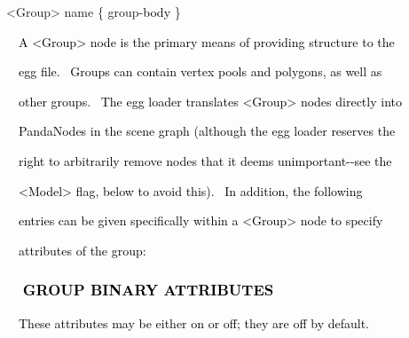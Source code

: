 \documentclass[a4paper]{article}
\newcommand\textstyleOOoComputerKeyWord[1]{\textrm{\textcolor[rgb]{0.0,0.0,0.5019608}{#1}}}
\newcommand\textstyleOOoAssemblerSpecialChar[1]{\textrm{\textcolor[rgb]{0.0,0.5019608,0.0}{#1}}}
\newcommand\textstyleOOoAssemblerIdent[1]{\textrm{\textcolor{black}{#1}}}
\newcommand\textstyleOOoAssemblerDirective[1]{\textrm{\textcolor[rgb]{0.0,0.5019608,1.0}{#1}}}
\begin{document}
{\color{black}
\textstyleOOoAssemblerSpecialChar{{\textless}}\textstyleOOoAssemblerDirective{Group}\textstyleOOoAssemblerSpecialChar{{\textgreater}}\textstyleOOoComputerKeyWord{\textcolor{black}{
}}\textstyleOOoAssemblerDirective{name}\textstyleOOoComputerKeyWord{\textcolor{black}{
}}\textstyleOOoAssemblerSpecialChar{\{}\textstyleOOoComputerKeyWord{\textcolor{black}{
}}\textstyleOOoAssemblerDirective{group}\textstyleOOoAssemblerSpecialChar{{}-}\textstyleOOoAssemblerIdent{body}\textstyleOOoComputerKeyWord{\textcolor{black}{
}}\textstyleOOoAssemblerSpecialChar{\}}}


\bigskip

{\color{black}
\textstyleOOoComputerKeyWord{\textcolor{black}{\ \ A {\textless}Group{\textgreater} node is the primary means of
providing structure to the}}}

{\color{black}
\textstyleOOoComputerKeyWord{\textcolor{black}{\ \ egg file. \ Groups can contain vertex pools and polygons, as well
as}}}

{\color{black}
\textstyleOOoComputerKeyWord{\textcolor{black}{\ \ other groups. \ The egg loader translates
{\textless}Group{\textgreater} nodes directly into}}}

{\color{black}
\textstyleOOoComputerKeyWord{\textcolor{black}{\ \ PandaNodes in the scene graph (although the egg loader reserves
the}}}

{\color{black}
\textstyleOOoComputerKeyWord{\textcolor{black}{\ \ right to arbitrarily remove nodes that it deems unimportant-{}-see
the}}}

{\color{black}
\textstyleOOoComputerKeyWord{\textcolor{black}{\ \ {\textless}Model{\textgreater} flag, below to avoid this). \ In
addition, the following}}}

{\color{black}
\textstyleOOoComputerKeyWord{\textcolor{black}{\ \ entries can be given specifically within a
{\textless}Group{\textgreater} node to specify}}}

{\color{black}
\textstyleOOoComputerKeyWord{\textcolor{black}{\ \ attributes of the group:}}}


\bigskip

\subsubsection[\ \ GROUP BINARY ATTRIBUTES]{\textstyleOOoComputerKeyWord{\textcolor{black}{\ \ GROUP BINARY
ATTRIBUTES}}}
\hypertarget{RefHeading7686869075401}{}
\bigskip

{\color{black}
\textstyleOOoComputerKeyWord{\textcolor{black}{\ \ These attributes may be either on or off; they are off by default.}}}
\end{document}
